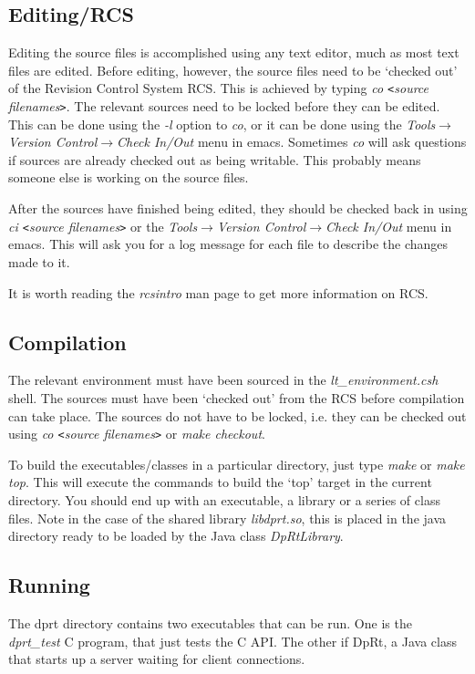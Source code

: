 \documentclass[10pt,a4paper]{article}
\begin{document}
\subsection{Editing/RCS}
Editing the source files is accomplished using any text editor, much as most text files are edited. Before 
editing, however, the source files need to be `checked out' of the Revision Control System RCS.
 This is achieved by typing
{\em co \verb'<'source filenames\verb'>'}. 
The relevant sources need to be locked before they can be edited. This can be done using the {\em -l} option to 
{\em co}, or it can be done using the {\em Tools$\rightarrow$Version Control$\rightarrow$Check In/Out} menu in emacs.
Sometimes {\em co} will ask questions if sources are already checked out as being
writable. This probably means someone else is working on the source files.

After the sources have finished being edited, they should be checked back in using {\em ci \verb'<'source filenames\verb'>'} or the {\em Tools$\rightarrow$Version Control$\rightarrow$Check In/Out} menu in emacs. This
will ask you for a log message for each file to describe the changes made to it.

It is worth reading the {\em rcsintro} man page to get more information on RCS.

\subsection{Compilation}
The relevant environment must have been sourced in the {\em lt\_environment.csh} shell. The sources must have been
`checked out' from the RCS before compilation can take place. The sources do not have to be locked, i.e. they can
be checked out using {\em co \verb'<'source filenames\verb'>'} or {\em make checkout}.

To build the executables/classes in a particular directory, just type {\em make} or {\em make top}. 
This will execute the commands
to build the `top' target in the current directory. You should end up with an executable, a library or a series
of class files. Note in the case of the shared library {\em libdprt.so}, this is placed in the java directory
ready to be loaded by the Java class {\em DpRtLibrary}.

\subsection{Running}
The dprt directory contains two executables that can be run. One is the {\em dprt\_test} C program, that just
tests the C API. The other if DpRt, a Java class that starts up a server waiting for client connections.
\end{document}
